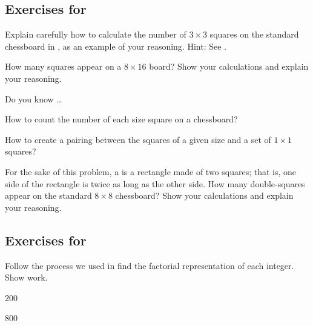 
\subsection*{Exercises for  \subhowmanysq}

\begin{exer}[\exerP] %
\label{exer_3times3_sq}
    Explain carefully how to calculate the number of $3\times3$ squares on the standard chessboard in , as an example of your reasoning. Hint: See .
\end{exer}

\begin{exer}[\exerU] %
\label{exer_sq_8times16}
    How many squares appear on a $8\times 16$ board?  Show your calculations and explain your reasoning.
\end{exer}

\begin{exer}[\exerR] %
\label{exer_dyk_how_many_sq}
    Do you know \ldots
        \begin{exerpart}
            \item How to count the number of each size square on a chessboard?
            \item How to create a pairing between the squares of a given size and a set of $1 \times 1$ squares?
        \end{exerpart}
\end{exer}

\begin{exer}[\exerE] %
\label{exer_doublesquares}
    For the sake of this problem, a  is a rectangle made of two squares; that is, one side of the rectangle is twice as long as the other side. 
    How many double-squares appear on the standard $8 \times 8$ chessboard?  Show your calculations and explain your reasoning.
\end{exer}


\subsection*{Exercises for  \subfactrep}

\begin{exer}[\exerP] %
\label{exer_examples_fact_rep}
    Follow the process we used in  find the factorial representation of each integer. Show work. 
    \begin{exerpart}
        \item 200
        \item 800
    \end{exerpart}
\end{exer}

